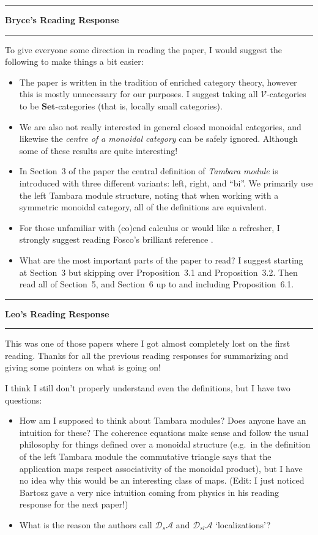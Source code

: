 \documentclass{amsart}
\newcommand{\iam}[1]{
  \vspace{0.25em}
  \hrule
  \vspace{0.25em}
  \textbf{{#1}'s Reading Response}
  \vspace{0.25em}
  \hrule
  \vspace{1em}
}
\begin{document}
\iam{Bryce}
To give everyone some direction in reading the paper, I would suggest the following to make
things a bit easier:
\begin{itemize}
\item The paper is written in the tradition of enriched category theory, however this is
mostly unnecessary for our purposes. I suggest taking all $\mathcal{V}$-categories
to be $\mathbf{Set}$-categories (that is, locally small categories).
\item We are also not really interested in general closed monoidal categories, and likewise
the \emph{centre of a monoidal category} can be safely ignored.
Although some of these results are quite interesting!
\item In Section~3 of the paper the central definition of \emph{Tambara module} is introduced
with three different variants: left, right, and ``bi''. We primarily use the left Tambara
module structure, noting that when working with a symmetric monoidal category, all of the
definitions are equivalent.
\item For those unfamiliar with (co)end calculus or would like a refresher, I strongly
suggest reading Fosco's brilliant reference \cite{Fosco}.
\item What are the most important parts of the paper to read? I suggest starting at
Section~3 but skipping over Proposition~3.1 and Proposition~3.2. Then read all of Section~5,
and Section~6 up to and including Proposition~6.1.
\end{itemize}

\iam{Leo}
This was one of those papers where I got almost completely lost on the first reading. Thanks for all the previous reading responses for summarizing and giving some pointers on what is going on!

I think I still don't properly understand even the definitions, but I have two questions:
\begin{itemize}
\item How am I supposed to think about Tambara modules? Does anyone have an intuition for these? The coherence equations make sense and follow the usual philosophy for things defined over a monoidal structure (e.g.~in the definition of the left Tambara module the commutative triangle says that the application maps respect associativity of the monoidal product), but I have no idea why this would be an interesting class of maps. (Edit: I just noticed Bartosz gave a very nice intuition coming from physics in his reading response for the next paper!)
\item What is the reason the authors call $\mathscr D_s\mathscr A$ and $\mathscr D_{sl}\mathscr A$ `localizations'?
\end{itemize}
\end{document}
